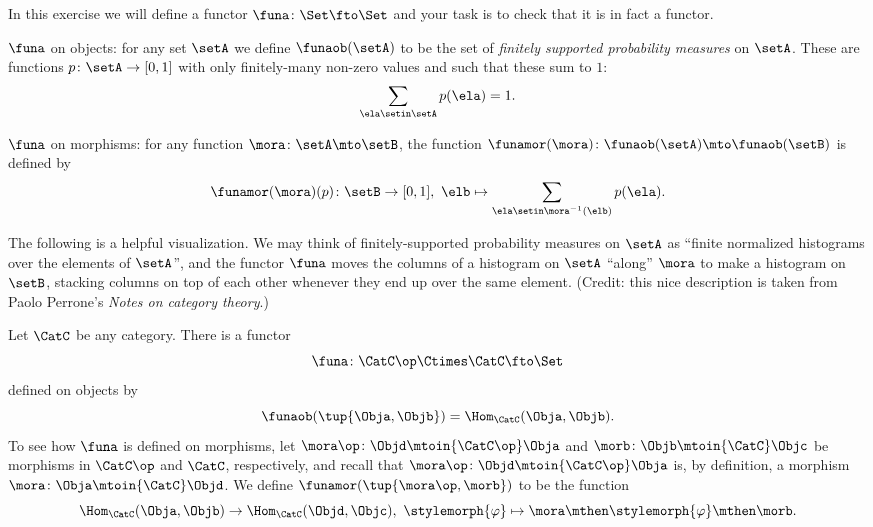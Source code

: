 \begin{gradedexercise}
\label{ex:probability-functor}

In this exercise we will define a functor $\funa \colon \Set \fto \Set$ and your task is to check that it is in fact a functor. 

$\funa$ on objects: for any set $\setA$ we define $\funaob(\setA)$ to be the set of \emph{finitely supported probability measures} on $\setA$. These are functions $p \colon \setA \to [0,1]$ with only finitely-many non-zero values and such that these sum to $1$:
\begin{equation}\label{eq:probability-measure}
\sum_{\ela \setin \setA} p(\ela) = 1. 
\end{equation}

$\funa$ on morphisms: for any function $\mora \colon \setA \mto \setB$, the function $\funamor(\mora) \colon \funaob(\setA) \mto \funaob(\setB)$ is defined by
\begin{equation}
\funamor(\mora)(p) \colon \setB \to [0,1], \ \elb \mapsto \sum_{\ela \setin \mora^{-1}(\elb)} p(\ela). 
\end{equation}

The following is a helpful visualization. We may think of finitely-supported probability measures on $\setA$ as ``finite normalized histograms over the elements of $\setA$'', and the functor $\funa$ moves the columns of a histogram on $\setA$ ``along'' $\mora$ to make a histogram on $\setB$, stacking columns on top of each other whenever they end up over the same element. (Credit: this nice description is taken from Paolo Perrone's \emph{Notes on category theory}.)
\end{gradedexercise}


\begin{example}\label{exa:hom-functor}
    Let $\CatC$ be any category.
    There is a functor
    \begin{equation}\label{eq:hom-functor-type}
        \funa \colon \CatC\op \Ctimes \CatC \fto \Set
    \end{equation}
    defined on objects by
    \begin{equation}\label{eq:hom-functor-on-objects}
        \funaob(\tup{\Obja, \Objb}) = \Hom_\CatC(\Obja, \Objb).
    \end{equation}
    To see how $\funa$ is defined on morphisms, let $\mora\op \colon \Objd \mtoin{\CatC\op} \Obja$ and $\morb \colon \Objb \mtoin{\CatC} \Objc$ be morphisms in $\CatC\op$ and $\CatC$, respectively, and recall that $\mora\op \colon \Objd \mtoin{\CatC\op} \Obja$ is, by definition, a morphism $\mora \colon \Obja \mtoin{\CatC} \Objd$.
    We define $\funamor(\tup{\mora\op, \morb})$ to be the function
    \begin{equation}\label{eq:hom-functor-on-morphisms}
        \Hom_\CatC(\Obja, \Objb) \to \Hom_\CatC(\Objd, \Objc), \ \stylemorph{\varphi} \mapsto \mora \mthen \stylemorph{\varphi} \mthen \morb.
    \end{equation}

\end{example}

